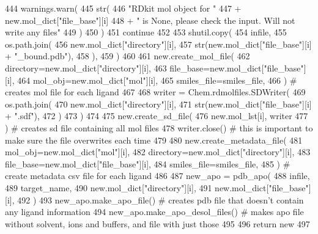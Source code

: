 \begin{DoxyCode}
444             warnings.warn(
445                 str(
446                     \textcolor{stringliteral}{"RDkit mol object for "}
447                     + new.mol\_dict[\textcolor{stringliteral}{"file\_base"}][i]
448                     + \textcolor{stringliteral}{" is None, please check the input. Will not write any files"}
449                 )
450             )
451             \textcolor{keywordflow}{continue}
452 
453         shutil.copy(
454             infile,
455             os.path.join(
456                 new.mol\_dict[\textcolor{stringliteral}{"directory"}][i],
457                 str(new.mol\_dict[\textcolor{stringliteral}{"file\_base"}][i] + \textcolor{stringliteral}{"\_bound.pdb"}),
458             ),
459         )
460 
461         new.create\_mol\_file(
462             directory=new.mol\_dict[\textcolor{stringliteral}{"directory"}][i],
463             file\_base=new.mol\_dict[\textcolor{stringliteral}{"file\_base"}][i],
464             mol\_obj=new.mol\_dict[\textcolor{stringliteral}{"mol"}][i],
465             smiles\_file=smiles\_file,
466         )  \textcolor{comment}{# creates mol file for each ligand}
467 
468         writer = Chem.rdmolfiles.SDWriter(
469             os.path.join(
470                 new.mol\_dict[\textcolor{stringliteral}{"directory"}][i],
471                 str(new.mol\_dict[\textcolor{stringliteral}{"file\_base"}][i] + \textcolor{stringliteral}{".sdf"}),
472             )
473         )
474 
475         new.create\_sd\_file(
476             new.mol\_lst[i], writer
477         )  \textcolor{comment}{# creates sd file containing all mol files}
478         writer.close()  \textcolor{comment}{# this is important to make sure the file overwrites each time}
479 
480         new.create\_metadata\_file(
481             mol\_obj=new.mol\_dict[\textcolor{stringliteral}{"mol"}][i],
482             directory=new.mol\_dict[\textcolor{stringliteral}{"directory"}][i],
483             file\_base=new.mol\_dict[\textcolor{stringliteral}{"file\_base"}][i],
484             smiles\_file=smiles\_file,
485         )  \textcolor{comment}{# create metadata csv file for each ligand}
486 
487         new\_apo = pdb\_apo(
488             infile,
489             target\_name,
490             new.mol\_dict[\textcolor{stringliteral}{"directory"}][i],
491             new.mol\_dict[\textcolor{stringliteral}{"file\_base"}][i],
492         )
493         new\_apo.make\_apo\_file()  \textcolor{comment}{# creates pdb file that doesn't contain any ligand information}
494         new\_apo.make\_apo\_desol\_files()  \textcolor{comment}{# makes apo file without solvent, ions and buffers, and file with
       just those}
495 
496     \textcolor{keywordflow}{return} new
497 \end{DoxyCode}
